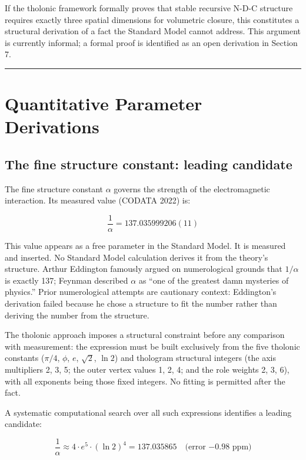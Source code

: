 \documentclass[12pt]{article}
\begin{document}
If the tholonic framework formally proves that stable recursive N-D-C
structure requires exactly three spatial dimensions for volumetric
closure, this constitutes a structural derivation of a fact the Standard
Model cannot address. This argument is currently informal; a formal
proof is identified as an open derivation in Section 7.

\begin{center}\rule{0.5\linewidth}{0.5pt}\end{center}

\section{Quantitative Parameter Derivations}\label{quantitative-parameter-derivations}

\subsection{The fine structure constant: leading candidate}\label{the-fine-structure-constant-leading-candidate}

The fine structure constant \(\alpha\) governs the strength of the
electromagnetic interaction. Its measured value (CODATA 2022) is:

\[\frac{1}{\alpha} = 137.035999206(11)\]

This value appears as a free parameter in the Standard Model. It is
measured and inserted. No Standard Model calculation derives it from the
theory's structure. Arthur Eddington famously argued on numerological
grounds that \(1/\alpha\) is exactly 137; Feynman described \(\alpha\)
as ``one of the greatest damn mysteries of physics.'' Prior
numerological attempts are cautionary context: Eddington's derivation
failed because he chose a structure to fit the number rather than
deriving the number from the structure.

The tholonic approach imposes a structural constraint before any
comparison with measurement: the expression must be built exclusively
from the five tholonic constants (\(\pi/4\), \(\phi\), \(e\),
\(\sqrt{2}\), \(\ln 2\)) and thologram structural integers (the axis
multipliers 2, 3, 5; the outer vertex values 1, 2, 4; and the role
weights 2, 3, 6), with all exponents being those fixed integers. No
fitting is permitted after the fact.

A systematic computational search over all such expressions identifies a
leading candidate:

\[\frac{1}{\alpha} \approx 4 \cdot e^5 \cdot (\ln 2)^4 = 137.035865 \quad \text{(error } {-0.98 \text{ ppm)}}\]
\end{document}
